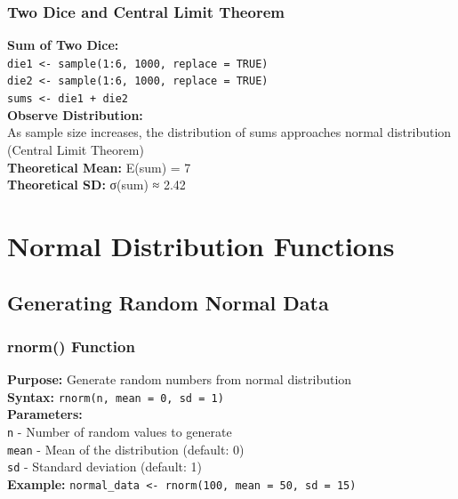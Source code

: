 \documentclass[11pt,a4paper]{article}
\begin{document}
\subsubsection{Two Dice and Central Limit Theorem}

\begin{probabilitybox}
\textbf{Sum of Two Dice:}\\
\texttt{die1 <- sample(1:6, 1000, replace = TRUE)}\\
\texttt{die2 <- sample(1:6, 1000, replace = TRUE)}\\
\texttt{sums <- die1 + die2}\\[0.3cm]
\textbf{Observe Distribution:}\\
As sample size increases, the distribution of sums approaches normal distribution (Central Limit Theorem)\\[0.3cm]
\textbf{Theoretical Mean:} E(sum) = 7\\
\textbf{Theoretical SD:} σ(sum) ≈ 2.42
\end{probabilitybox}

\section{Normal Distribution Functions}

\subsection{Generating Random Normal Data}

\subsubsection{rnorm() Function}

\begin{formulabox}
\textbf{Purpose:} Generate random numbers from normal distribution\\[0.3cm]
\textbf{Syntax:} \texttt{rnorm(n, mean = 0, sd = 1)}\\[0.3cm]
\textbf{Parameters:}\\
\texttt{n} - Number of random values to generate\\
\texttt{mean} - Mean of the distribution (default: 0)\\
\texttt{sd} - Standard deviation (default: 1)\\[0.3cm]
\textbf{Example:} \texttt{normal\_data <- rnorm(100, mean = 50, sd = 15)}
\end{formulabox}
\end{document}

